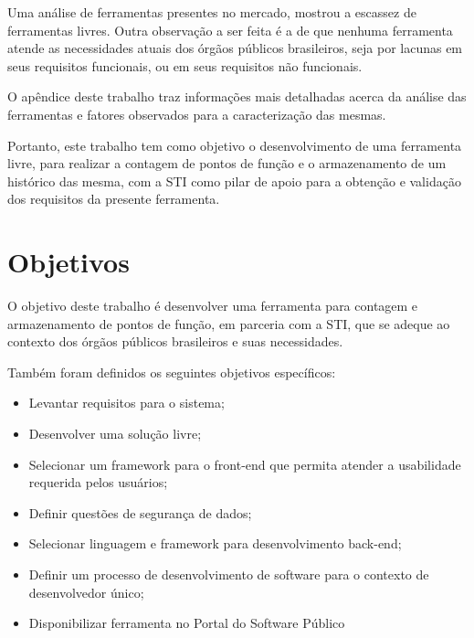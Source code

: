 Uma análise de ferramentas presentes no mercado, mostrou a escassez de ferramentas livres. Outra observação a ser feita é a de que nenhuma ferramenta atende as necessidades atuais dos órgãos públicos brasileiros, seja por lacunas em seus requisitos funcionais, ou em seus requisitos não funcionais.

O apêndice  deste trabalho traz informações mais detalhadas acerca da análise das ferramentas e fatores observados para a caracterização das mesmas.

Portanto, este trabalho tem como objetivo o desenvolvimento de uma ferramenta livre, para realizar a contagem de pontos de função e o armazenamento de um histórico das mesma, com a STI como pilar de apoio para a obtenção e validação dos requisitos da presente ferramenta.

\section{Objetivos}

O objetivo deste  trabalho é desenvolver uma ferramenta para contagem e
armazenamento de pontos de função, em parceria com a STI, que se adeque ao
contexto dos órgãos públicos brasileiros e suas necessidades.

Também foram definidos os seguintes objetivos específicos:

\begin{itemize}

  \item Levantar requisitos para o sistema;

  \item Desenvolver uma solução livre;

  \item Selecionar um framework para o front-end que permita atender a usabilidade requerida pelos usuários;

  \item  Definir questões de segurança de dados;

  \item Selecionar linguagem e framework para desenvolvimento back-end;

  \item Definir um processo de desenvolvimento de software para o contexto de
  desenvolvedor único;

  \item Disponibilizar ferramenta no Portal do Software Público

\end{itemize}

